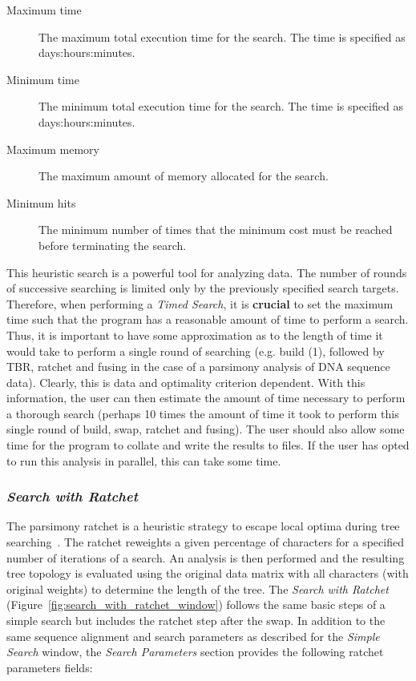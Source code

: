 {\begin{description}
\item[Maximum time] The maximum total execution time for the search. The time is specified as
days:hours:minutes.
\item[Minimum time] The minimum total execution time for the search. The time is specified as
days:hours:minutes.
\item[Maximum memory] The maximum amount of memory allocated for the search.
\item[Minimum hits] The minimum number of times that the minimum cost must be reached before terminating the search.
\end{description}

This heuristic search is a powerful tool for analyzing data. The number of rounds of successive searching is limited 
only by the previously specified search targets. Therefore, when performing a \emph{Timed Search}, it is {\bf crucial} to 
set the maximum time such that the program has a reasonable amount of time to perform a search.  Thus, it is important 
to have some approximation as to the length of time it would take to perform a single round of searching (e.g. build (1), 
followed by TBR, ratchet and fusing in the case of a parsimony analysis of DNA sequence data).  Clearly, this is data 
and optimality criterion dependent.  With this information, the user can then estimate the amount of time necessary to 
perform a thorough search (perhaps 10 times the amount of time it took to perform this single round of build, swap, ratchet
and fusing).  The user should also allow some time for the program to collate and write the results to 
files.  If the user has opted to run this analysis in parallel, this can take some time.

\subsubsection*{\emph{Search with Ratchet}}

The parsimony ratchet is a heuristic strategy to escape  local optima during tree searching~\cite{Nixon1999}. The 
ratchet reweights a given percentage of characters for a specified number of iterations of a search. An analysis is 
then performed and the resulting tree topology is evaluated using the original data matrix with all characters (with original 
weights) to determine the length of the tree. The \emph{Search with Ratchet} (Figure~\ref{fig:search_with_ratchet_window}) 
follows the same basic steps of a simple search but includes the ratchet step after the swap. In addition to the same sequence 
alignment and search parameters as described for the \emph{Simple Search} window, the \emph{Search Parameters} section 
provides the following ratchet parameters fields:

}
